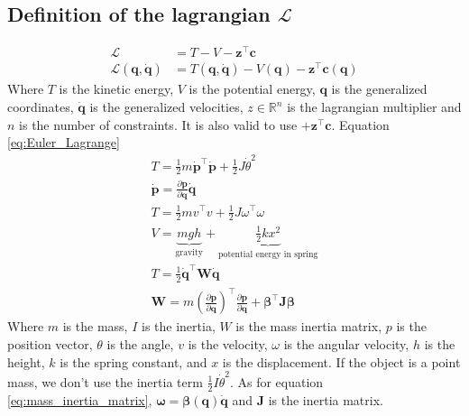 \subsection{Definition of the lagrangian $\mathcal{L}$}
\begin{subequations}
\begin{align}
    \mathcal{L} &= T - V - \mathbf{z}^\top\mathbf{c}\\
    \mathcal{L}(\mathbf{q}, \dot{\mathbf{q}}) &= T(\mathbf{q}, \dot{\mathbf{q}}) - V(\mathbf{q}) - \mathbf{z}^\top \mathbf{c(q)}
    \label{eq:Euler_Lagrange}
\end{align}
\end{subequations}
Where $T$ is the kinetic energy, $V$ is the potential energy, $\mathbf{q}$ is the generalized coordinates, $\dot{\mathbf{q}}$ is the generalized velocities, $z \in \mathbb{R}^n $ is the lagrangian multiplier and $n$ is the number of constraints. It is also valid to use $+\mathbf{z}^\top\mathbf{c}$. Equation \eqref{eq:Euler_Lagrange} \newline
\begin{subequations}
\begin{align}
    T = \frac{1}{2}m\dot{\mathbf{p}}^\top\dot{\mathbf{p}} + \frac{1}{2}J\dot{\theta}^2 \\
    \mathbf{\dot{p}} = \frac{\partial \mathbf{p}}{\partial \mathbf{q}}\dot{\mathbf{q}} \\
    T = \frac{1}{2}mv^\top v + \frac{1}{2}J\omega^\top \omega \\
    V = \underbrace{mgh}_{\text{gravity}}  + \underbrace{\frac{1}{2}kx^2}_{\text{potential energy in spring}}  \\
    T = \frac{1}{2}\dot{\mathbf{q}}^\top\mathbf{W}\dot{\mathbf{q}} \\
    \mathbf{W} = m\left(\frac{\partial \mathbf{p}}{\partial \mathbf{q}}\right)^\top \frac{\partial \mathbf{p}}{\partial \mathbf{q}} + \mathbf{\beta}^\top \mathbf{J}\mathbf{\beta}
    \label{eq:mass_inertia_matrix}
\end{align}
\end{subequations}
Where $m$ is the mass, $I$ is the inertia, $W$ is the mass inertia matrix, $p$ is the position vector, $\theta$ is the angle, $v$ is the velocity, $\omega$ is the angular velocity, $h$ is the height, $k$ is the spring constant, and $x$ is the displacement. \newline 
If the object is a point mass, we don't use the inertia term $\frac{1}{2}I\dot{\theta}^2$. \newline
As for equation \eqref{eq:mass_inertia_matrix}, $\mathbf{\omega} = \mathbf{\beta(q)\dot{q}}$ and $\mathbf{J}$ is the inertia matrix. \newline
